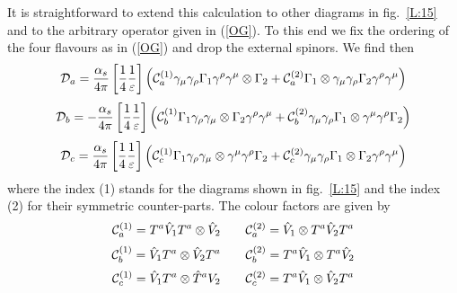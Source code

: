 \documentclass[12pt]{article}
\def\as{\alpha_s}
\newcommand{\be}{\begin{equation}}
\newcommand{\ee}{\end{equation}}
\begin{document}
\begin{itemize}
\begin{itemize}
\begin{itemize}
It is straightforward to extend this calculation to other diagrams
in fig.~\ref{L:15} and to the arbitrary operator given in (\ref{OG}).
To this end we fix the ordering of the four flavours as in (\ref{OG})
and drop the external spinors. We find then
\be\label{DA}
{\cal D}_a=\frac{\as}{4\pi}
\left[\frac{1}{4}\frac{1}{\varepsilon}\right]
\left({\cal C}_a^{(1)}
\gamma_\mu\gamma_\rho\Gamma_1\gamma^\rho\gamma^\mu \otimes \Gamma_2
+{\cal C}_a^{(2)}
\Gamma_1\otimes\gamma_\mu\gamma_\rho\Gamma_2\gamma^\rho\gamma^\mu 
\right)
\ee
\be\label{DB}
{\cal D}_b=-\frac{\as}{4\pi}
\left[\frac{1}{4}\frac{1}{\varepsilon}\right]
\left({\cal C}_b^{(1)}
\Gamma_1\gamma_\rho\gamma_\mu\otimes\Gamma_2\gamma^\rho\gamma^\mu 
+{\cal C}_b^{(2)}
\gamma_\mu\gamma_\rho\Gamma_1\otimes\gamma^\mu\gamma^\rho\Gamma_2 
\right)
\ee
\be\label{DC}
{\cal D}_c=\frac{\as}{4\pi}
\left[\frac{1}{4}\frac{1}{\varepsilon}\right]
\left({\cal C}_c^{(1)}
\Gamma_1\gamma_\rho\gamma_\mu\otimes\gamma^\mu\gamma^\rho\Gamma_2 
+{\cal C}_c^{(2)}
\gamma_\mu\gamma_\rho\Gamma_1\otimes\Gamma_2\gamma^\rho\gamma^\mu 
\right)
\ee
where the index (1) stands for the diagrams shown in fig.~\ref{L:15}
and the index (2) for their symmetric counter-parts.
The colour factors are given by 
\be\label{CA}
{\cal C}_a^{(1)}=T^a\hat V_1 T^a\otimes\hat V_2
\qquad 
{\cal C}_a^{(2)}=\hat V_1\otimes T^a\hat V_2 T^a
\ee
\be\label{CB}
{\cal C}_b^{(1)}=\hat V_1 T^a\otimes\hat V_2 T^a
\qquad 
{\cal C}_b^{(2)}=T^a\hat V_1\otimes T^a\hat V_2 
\ee
\be\label{CC}
{\cal C}_c^{(1)}=\hat V_1 T^a\otimes\hat T^a V_2 
\qquad 
{\cal C}_c^{(2)}=T^a\hat V_1\otimes \hat V_2 T^a 
\ee

\end{itemize}
\end{itemize}
\end{itemize}
\end{document}
